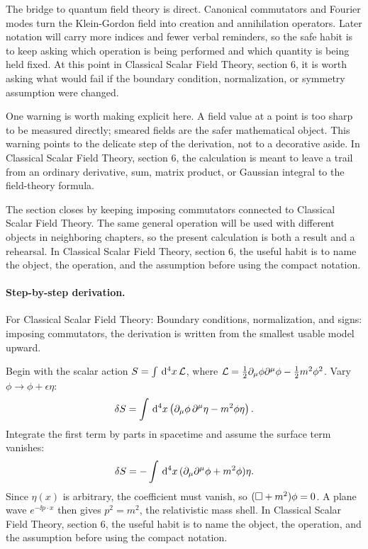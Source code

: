 The bridge to quantum field theory is direct.  Canonical commutators and Fourier modes turn the Klein-Gordon field into creation and annihilation operators.  Later notation will carry more indices and fewer verbal reminders, so the safe habit is to keep asking which operation is being performed and which quantity is being held fixed.  At this point in Classical Scalar Field Theory, section 6, it is worth asking what would fail if the boundary condition, normalization, or symmetry assumption were changed.

One warning is worth making explicit here.  A field value at a point is too sharp to be measured directly; smeared fields are the safer mathematical object.  This warning points to the delicate step of the derivation, not to a decorative aside.  In Classical Scalar Field Theory, section 6, the calculation is meant to leave a trail from an ordinary derivative, sum, matrix product, or Gaussian integral to the field-theory formula.

The section closes by keeping imposing commutators connected to Classical Scalar Field Theory.  The same general operation will be used with different objects in neighboring chapters, so the present calculation is both a result and a rehearsal.  In Classical Scalar Field Theory, section 6, the useful habit is to name the object, the operation, and the assumption before using the compact notation.



\paragraph{Step-by-step derivation.}

For Classical Scalar Field Theory: Boundary conditions, normalization, and signs: imposing commutators, the derivation is written from the smallest usable model upward.

Begin with the scalar action \(S=\int\,\mathrm d^4x\,\mathcal L\), where \(\mathcal L=\frac12\partial_\mu\phi\partial^\mu\phi-\frac12m^2\phi^2\).  Vary \(\phi\to\phi+\epsilon\eta\):
\[
  \delta S=\int\,\mathrm d^4x\left(\partial_\mu\phi\,\partial^\mu\eta-m^2\phi\eta\right).
\]
Integrate the first term by parts in spacetime and assume the surface term vanishes:
\[
  \delta S=-\int\,\mathrm d^4x\,(\partial_\mu\partial^\mu\phi+m^2\phi)\eta.
\]
Since \(\eta(x)\) is arbitrary, the coefficient must vanish, so \((\Box+m^2)\phi=0\).  A plane wave \(e^{-\ii p\cdot x}\) then gives \(p^2=m^2\), the relativistic mass shell.  In Classical Scalar Field Theory, section 6, the useful habit is to name the object, the operation, and the assumption before using the compact notation.

